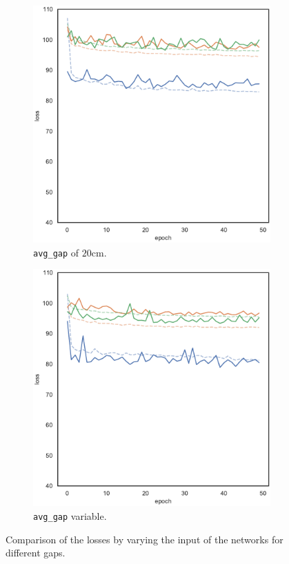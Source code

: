 \begin{figure}[!htb]
\begin{subfigure}[h]{0.3\textwidth}
		\includegraphics[width=\textwidth]{contents/images/task1-extension/loss-distributed-gap_20@copy}%
		\caption{\texttt{avg\_gap} of $20$\gls{cm}.}
	\end{subfigure}
	\hfill
	\begin{subfigure}[h]{0.3\textwidth}
		\centering
		\includegraphics[width=\textwidth]{contents/images/task1-extension/loss-distributed-gap_var@copy}
		\caption{\texttt{avg\_gap} variable.}
	\end{subfigure}
		\caption[Losses summary of the second set of 
		experiments.]{Comparison of the losses by varying the input of the networks 
		for different gaps.}
	\label{fig:distloss820var}
\end{figure}
\vspace{-0.5cm}
